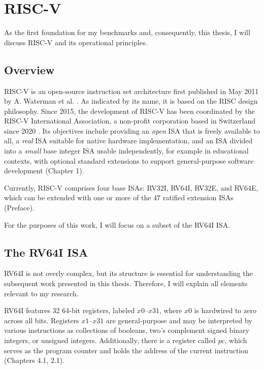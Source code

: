\chapter{RISC-V}\label{chap:riscv}

As the first foundation for my benchmarks and, consequently, this thesis, I
will discuss RISC-V and its operational principles.

\section{Overview}

RISC-V is an open-source instruction set architecture first published in May
2011 by A. Waterman et al. \cite{first_riscv}. As indicated by its name, it is
based on the RISC design philosophy.  Since
2015, the development of RISC-V has been coordinated by the RISC-V
International Association, a non-profit corporation based in Switzerland since
2020 \cite{riscvorg}. Its objectives include providing an \emph{open} ISA that
is freely available to all, a \emph{real} ISA suitable for native hardware
implementation, and an ISA divided into a \emph{small} base integer ISA usable
independently, for example in educational contexts, with optional standard
extensions to support general-purpose software development
\cite{riscv-isa}(Chapter 1).

Currently, RISC-V comprises four base ISAs: RV32I, RV64I, RV32E, and RV64E,
which can be extended with one or more of the 47 ratified extension ISAs
\cite{riscv-isa} (Preface).

 

For the purposes of this work, I will focus on a subset of the RV64I ISA.

\section{The RV64I ISA}
RV64I is not overly complex, but its structure is essential for understanding
the subsequent work presented in this thesis. Therefore, I will explain all
elements relevant to my research.

RV64I features 32 64-bit registers, labeled $x0$–$x31$, where $x0$ is hardwired
to zero across all bits. Registers $x1$–$x31$ are general-purpose and may be
interpreted by various instructions as collections of booleans, two's
complement signed binary integers, or unsigned integers. Additionally, there is
a register called $pc$, which serves as the program counter and holds the
address of the current instruction \cite{riscv-isa}(Chapters 4.1, 2.1).

